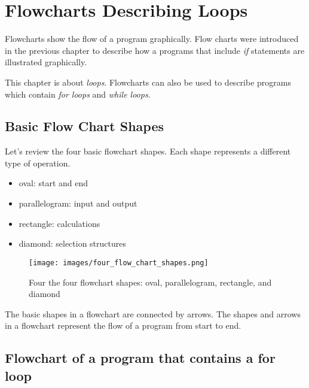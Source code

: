 \documentclass{book}
\makeatletter
\def\maxwidth{\ifdim\Gin@nat@width>\linewidth\linewidth
\else\Gin@nat@width\fi}
\let\Oldincludegraphics\includegraphics
\renewcommand{\includegraphics}[1]{\Oldincludegraphics[width=.8\maxwidth]{#1}}
\providecommand{\tightlist}{%
      \setlength{\itemsep}{0pt}\setlength{\parskip}{0pt}}
\makeatother
\begin{document}
    
        \hypertarget{flowcharts-describing-loops}{%
\section{Flowcharts Describing
Loops}\label{flowcharts-describing-loops}}
    




    
        Flowcharts show the flow of a program graphically. Flow charts were
introduced in the previous chapter to describe how a programs that
include \emph{if} statements are illustrated graphically.

This chapter is about \emph{loops}. Flowcharts can also be used to
describe programs which contain \emph{for loops} and \emph{while loops}.
    




    
        \hypertarget{basic-flow-chart-shapes}{%
\subsection{Basic Flow Chart Shapes}\label{basic-flow-chart-shapes}}
    




    
        Let's review the four basic flowchart shapes. Each shape represents a
different type of operation.

\begin{itemize}
\tightlist
\item
  oval: start and end
\item
  parallelogram: input and output
\item
  rectangle: calculations
\item
  diamond: selection structures
\end{itemize}

\begin{figure}
\centering
\texttt{[image: images/four\_flow\_chart\_shapes.png]}
\caption{Four the four flowchart shapes: oval, parallelogram, rectangle,
and diamond}
\end{figure}

The basic shapes in a flowchart are connected by arrows. The shapes and
arrows in a flowchart represent the flow of a program from start to end.
    




    
        \hypertarget{flowchart-of-a-program-that-contains-a-for-loop}{%
\subsection{Flowchart of a program that contains a for
loop}\label{flowchart-of-a-program-that-contains-a-for-loop}}
    
\end{document}
